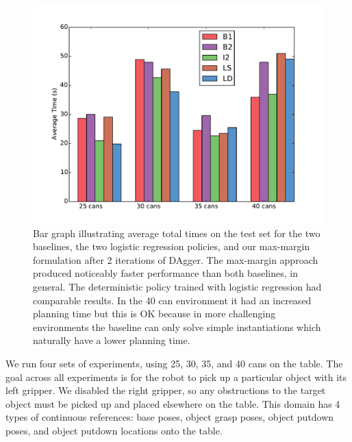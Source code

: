 \begin{figure}[h]
  \centering
    \includegraphics[scale=0.43]{images/results_bar_time}
  \caption{\small{Bar graph illustrating average total times on the test set for the
two baselines, the two logistic regression policies, and our max-margin formulation after 2 iterations of DAgger. The max-margin approach produced noticeably faster
performance than both baselines, in general. The deterministic policy trained with logistic regression had comparable results. In the 40 can environment it had an increased planning time but this is OK because in more challenging environments the baseline can only solve simple instantiations which naturally have a lower planning time.}}
  \label{fig:results_bar_time}
\end{figure}

We run four sets of experiments, using 25, 30, 35, and 40 cans on the table.
The goal across all experiments is for the robot to pick up a particular object with its
left gripper. We disabled the right gripper, so any obstructions to the target object must be picked up and
placed elsewhere on the table. This domain has 4 types of continuous references: base poses, object grasp
poses, object putdown poses, and object putdown locations onto the table.


